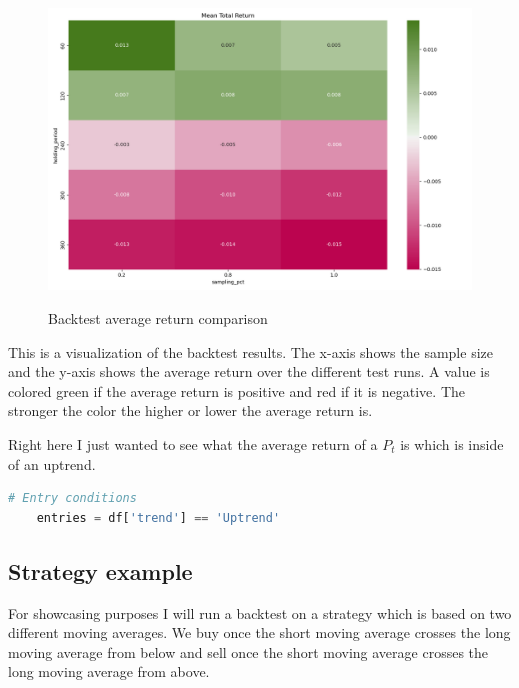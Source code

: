 \documentclass[12pt]{article}
\begin{document}
\newpage







\begin{figure}[H]
    \centering
    \includegraphics[width=\textwidth,height=0.7\textheight,keepaspectratio]{imgs/showcase_market_simulation.png}
    \label{fig:bullish_outliers_comparison}
    \caption{Backtest average return comparison}
\end{figure}

This is a visualization of the backtest results. The x-axis shows the sample size and the y-axis shows the average return over the different test runs.
A value is colored green if the average return is positive and red if it is negative. The stronger the color the higher or lower the average return is.


Right here I just wanted to see what the average return of a $P_t$ is which is inside of an uptrend.

\begin{lstlisting}[language=Python]
    # Entry conditions
    entries = df['trend'] == 'Uptrend'
\end{lstlisting}











\newpage
\subsection{Strategy example}
For showcasing purposes I will run a backtest on a strategy which is based on two different moving averages. We buy once the short moving average crosses the long moving average from below and sell once the short moving average crosses the long moving average from above.
\end{document}
